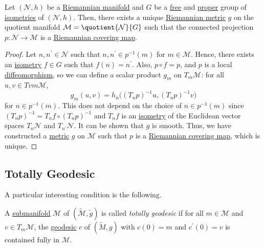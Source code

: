 
\begin{proposition}
	Let \((\mathcal{N}, h )\) be a \hyperref[def:Riemannian-manifold]{Riemannian manifold} and \(G\) be a \href{https://en.wikipedia.org/wiki/Free_group}{free} and \href{https://mathworld.wolfram.com/ProperGroupAction.html}{proper} group of \hyperref[def:isometry]{isometries} of \((\mathcal{N} , h)\). Then, there exists a unique \hyperref[def:Riemannian-metric]{Riemannian metric} \(g\) on the quotient manifold \(\mathcal{M} = \quotient{\mathcal{N} }{G} \) such that the connected projection \(p\colon \mathcal{N} \to \mathcal{M} \) is a \hyperref[def:Riemannian-covering-map]{Riemannian covering map}.
\end{proposition}
\begin{proof}
	Let \(n, n^\prime \in \mathcal{N} \) such that \(n, n^\prime \in p ^{-1} (m)\) for \(m\in \mathcal{M} \). Hence, there exists an \hyperref[def:isometry]{isometry} \(f\in G\) such that \(f(n) = n^\prime \). Also, \(p \circ f = p\), and \(p\) is a local \hyperref[def:diffeomorphism]{diffeomorphism}, so we can define a scalar product \(g_m\) on \(T_m \mathcal{M} \): for all \(u, v\in Tvm \mathcal{M} \),
	\[
		g_m(u, v) = h_n\big( (T_n p)^{-1} u, (T_n p)^{-1} v\big)
	\]
	for \(n\in p ^{-1} (m)\). This does not depend on the choice of \(n\in p ^{-1} (m)\) since \((T_n p)^{-1} = T_n f \circ (T_n p)^{-1} \) and \(T_n f\) is an \hyperref[def:isometry]{isometry} of the Euclidean vector spaces \(T_n \mathcal{N} \) and \(T_{n^\prime } \mathcal{N} \). It can be shown that \(g\) is smooth. Thus, we have constructed a \hyperref[def:Riemannian-metric]{metric} \(g\) on \(\mathcal{M} \) such that \(p\) is a \hyperref[def:Riemannian-covering-map]{Riemannian covering map}, which is unique.
\end{proof}

\subsection{Totally Geodesic}
A particular interesting condition is the following.

\begin{definition}\label{def:totally-geodesic}
	A \hyperref[def:submanifold]{submanifold} \(\mathcal{M} \) of \((\widetilde{\mathcal{M} } , \widetilde{g} )\) is called \emph{totally geodesic} if for all \(m\in \mathcal{M} \) and \(v\in T_m \mathcal{M} \), the \hyperref[def:geodesic]{geodesic} \(c\) of \((\widetilde{M}, g)\) with \(c(0) = m\) and \(c^\prime (0) = v\) is contained fully in \(\mathcal{M} \).
\end{definition}

